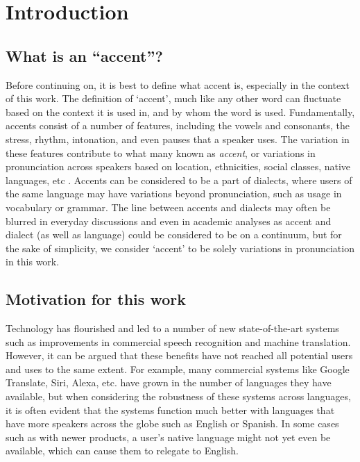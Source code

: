 \documentclass
[
    a4paper,
    twoside,
    12pt,
]
{report}
\begin{document}
\clearpage
\cleardoublepage
{}
\setcounter{page}{1}

\chapter{Introduction}

\hypertarget{what-is-an-accent}{%
\section{What is an ``accent''?}\label{what-is-an-accent}}

Before continuing on, it is best to define what accent is, especially in
the context of this work. The definition of `accent', much like any
other word can fluctuate based on the context it is used in, and by whom
the word is used. Fundamentally, accents consist of a number of
features, including the vowels and consonants, the stress, rhythm,
intonation, and even pauses that a speaker uses. The variation in these
features contribute to what many known as \emph{accent}, or variations
in pronunciation across speakers based on location, ethnicities, social
classes, native languages, etc \parencite{crystal2008}. Accents can be
considered to be a part of dialects, where users of the same language
may have variations beyond pronunciation, such as usage in vocabulary or
grammar. The line between accents and dialects may often be blurred in
everyday discussions and even in academic analyses as accent and dialect
(as well as language) could be considered to be on a continuum, but for
the sake of simplicity, we consider `accent' to be solely variations in
pronunciation in this work.

\hypertarget{motivation-for-this-work}{%
\section{Motivation for this work}\label{motivation-for-this-work}}

Technology has flourished and led to a number of new state-of-the-art
systems such as improvements in commercial speech recognition and
machine translation. However, it can be argued that these benefits have
not reached all potential users and uses to the same extent. For
example, many commercial systems like Google Translate, Siri, Alexa,
etc. have grown in the number of languages they have available, but when
considering the robustness of these systems across languages, it is
often evident that the systems function much better with languages that
have more speakers across the globe such as English or Spanish. In some
cases such as with newer products, a user's native language might not
yet even be available, which can cause them to relegate to English.
\end{document}
